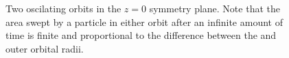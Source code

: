 \begin{figure}[!htbp]
    \centering
    \caption{Two oscilating orbits in the $z = 0$ symmetry plane. Note that the area swept by a particle in either orbit after an infinite amount of time is finite and proportional to the difference between the and outer orbital radii.}
    \label{ch:penrose_binaries/fig:z_orbits}
\end{figure}

